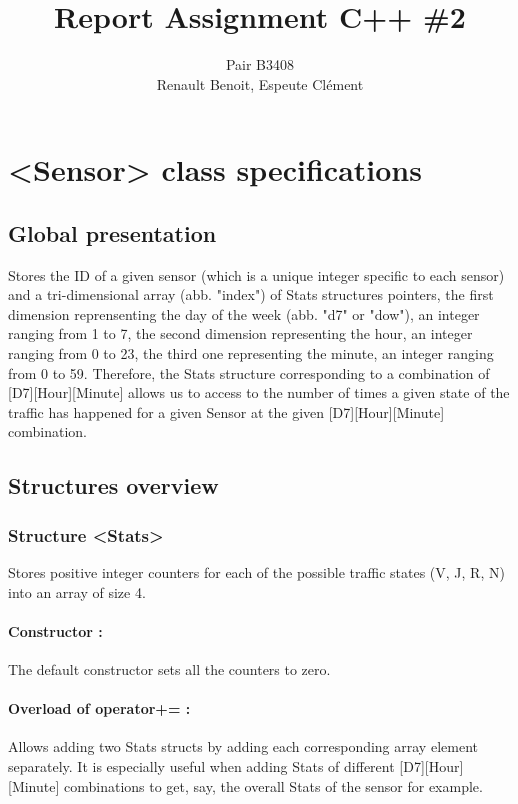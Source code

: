 \documentclass[10pt]{article}
\title{Report Assignment C++ \#2}
\author{Pair B3408 \\ {\sc Renault} Benoit, {\sc Espeute} Clément}
\date{}
\begin{document}
\pagestyle{fancy}
\maketitle

\section{<Sensor> class specifications}
\subsection{Global presentation}
Stores the ID of a given sensor (which is a unique integer specific to each sensor) and a tri-dimensional array (abb. "index") of Stats structures pointers, the first dimension reprensenting the day of the week (abb. "d7" or "dow"), an integer ranging from 1 to 7, the second dimension representing the hour, an integer ranging from 0 to 23, the third one representing the minute, an integer ranging from 0 to 59. Therefore, the Stats structure corresponding to a combination of [D7][Hour][Minute] allows us to access to the number of times a given state of the traffic has happened for a given Sensor at the given [D7][Hour][Minute] combination.

\subsection{Structures overview}
\subsubsection*{Structure <Stats>}
Stores positive integer counters for each of the possible traffic states (V, J, R, N) into an array of size 4.

\paragraph{Constructor :}
The default constructor sets all the counters to zero.

\paragraph{Overload of operator+= :}
Allows adding two Stats structs by adding each corresponding array element separately. It is especially useful when adding Stats of different [D7][Hour][Minute] combinations to get, say, the overall Stats of the sensor for example.
\end{document}
